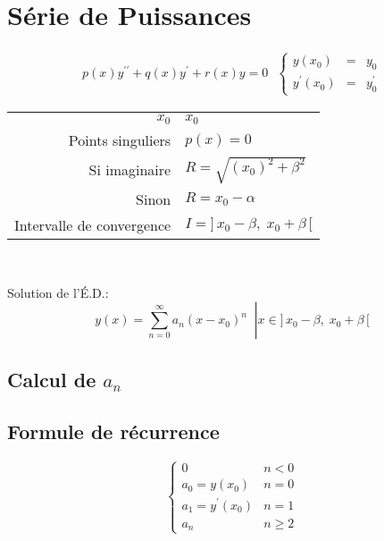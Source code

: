 \section{Série de Puissances}

\begin{gather*}
p(x)y^{\prime\prime} +q(x)y^{\prime}+r(x)y=0 ~~~  \left\{ \begin{array}{rcl}
y(x_0)& =& y_0\\
y^{\prime}(x_0) & = & y^{\prime}_0
\end{array} \right.
\end{gather*}

\centering
\begin{tabular}{rl}\hline
    $x_0$ & $x_0$ \\
    Points singuliers & \(p(x)=0\)\\
    Si imaginaire & \(R=\sqrt{(x_0)^2 + \beta^2}\)\\
    Sinon & \(R=x_0-\alpha\)\\
    Intervalle de convergence & \(I=]\,x_0-\beta,\; x_0+\beta\,[\)\\\hline
\end{tabular}
\\\raggedright
Solution de l'É.D.:
\begin{equation*}
    \left. y(x)=\sum^{\infty}_{n=0} a_n (x-x_0)^n  \;\;\right| x \in ]\,x_0-\beta,\; x_0+\beta\,[
\end{equation*}

\subsection{Calcul de \(a_n\) \hfill}

\subsection{Formule de récurrence \hfill}
\begin{equation*}
    \left\{ \begin{array}{ll}
        0 & n<0 \\
        a_0=y(x_0) & n=0\\
        a_1=y^{\prime}(x_0) & n=1\\
        a_n & n\geq 2
    \end{array}\right.
\end{equation*}
    